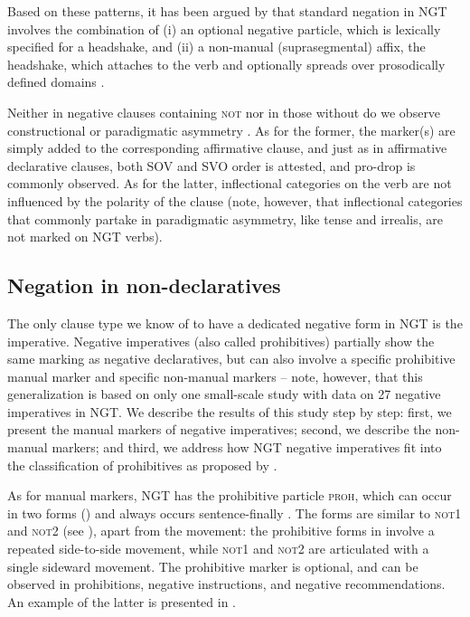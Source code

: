 \documentclass[output=paper,colorlinks,citecolor=brown]{langscibook}
\begin{document}
Based on these patterns, it has been argued by \textcite{OomenEtAl2018} that standard negation in NGT involves the combination of (i) an optional negative particle, which is lexically specified for a headshake, and (ii) a non-manual (suprasegmental) affix, the headshake, which attaches to the verb and optionally spreads over prosodically defined domains 
\citep[comparable to tone sandhi phenomena in spoken language; see][]{Pfau2016}.

Neither in negative clauses containing \textsc{not} nor in those without do we observe constructional or paradigmatic asymmetry \citep{Miestamo2009neg.pragmatics}. As for the former, the marker(s) are simply added to the corresponding affirmative clause, and just as in affirmative declarative clauses, both SOV and SVO order is attested, and pro-drop is commonly observed. As for the latter, inflectional categories on the verb are not influenced by the polarity of the clause (note, however, that inflectional categories that commonly partake in paradigmatic asymmetry, like tense and irrealis, are not marked on NGT verbs).

\subsection{Negation in non-declaratives} \label{sec:ngt:non-decl}
The only clause type we know of to have a dedicated negative form in NGT is the imperative. Negative imperatives (also called prohibitives) partially show the same marking as negative declaratives, but can also involve a specific prohibitive manual marker and specific non-manual markers – note, however, that this generalization is based on only one small-scale study with data on 27 negative imperatives in NGT. We describe the results of this study \citep{Spruijt2019} step by step: first, we present the manual markers of negative imperatives; second, we describe the non-manual markers; and third, we address how NGT negative imperatives fit into the classification of prohibitives as proposed by \citet{AuweraEtAl2013}.

As for manual markers, NGT has the prohibitive particle \textsc{proh}, which can occur in two forms () and always occurs sentence-finally \citep{Spruijt2019}. The forms are similar to \textsc{not1} and \textsc{not2} (see ), apart from the movement: the prohibitive forms in  involve a repeated side-to-side movement, while \textsc{not1} and \textsc{not2} are articulated with a single sideward movement. The prohibitive marker is optional, and can be observed in prohibitions, negative instructions, and negative recommendations. An example of the latter is presented in .
\end{document}
